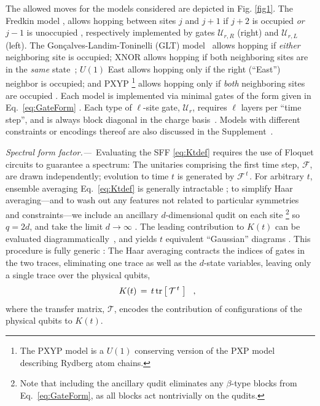 \documentclass[prl,aps,amsfonts,twocolumn,superscriptaddress,notitlepage,floatfix]{revtex4-1}
\newcommand{\be}{\begin{eqnarray}}
\newcommand{\ee}{\end{eqnarray}}
\newcommand{\tr}[1]{{\rm tr} \left[ #1 \right]}
\def\gate{\mathcal{U}}
\def\Floq{\mathcal{F}}
\def\Tmat{\mathcal{T}}
\def\Ldim{q}
\def\ancilla{d}
\begin{document}
The allowed moves for the models considered are depicted in Fig. \ref{fig1}. The Fredkin model \cite{FredkinEntanglement,Korepin2016fredkin,Korepin2017fredkin,ChenFredkin2017,ChenFredkin2017a,Zhang2017fredkin,Udagawa2017fredkin,FredkinFragmentScar,ChenFredkin2020}, allows hopping between sites $j$ and $j+1$ if $j+2$ is occupied %
\emph{or} $j-1$ is unoccupied%
, respectively implemented by gates $\gate^{\,}_{r,R}$ (right) and $\gate^{\,}_{r,L}$ (left). %
The Gon\c{c}alves-Landim-Toninelli (GLT) model~\cite{GLT} allows hopping if \emph{either} neighboring site is occupied; XNOR allows hopping if both neighboring sites are in the \emph{same} state~\cite{PhysRevLett.124.207602,10.21468/SciPostPhysCore.4.2.010,PhysRevLett.125.245303,2021arXiv210502252P,2021arXiv210600696P,2021arXiv210804845B}; $U(1)$ East allows hopping only if the right (``East'') neighbor is occupied; and PXYP \footnote{The PXYP model is a $U(1)$ conserving version of the PXP model describing Rydberg atom chains.} allows hopping only if \emph{both} neighboring sites are occupied \cite{KCMRydberg,Bernien2017,Turner2018,PhysRevLett.121.085701,MotrunichRydbergScar,Bluvstein_2021}. Each model is implemented via minimal gates of the form given in Eq.~\ref{eq:GateForm}%
. Each type of $\ell$-site gate,  $\gate^{\,}_r$, requires $\ell$ layers per ``time step'', and is always block diagonal in the charge basis~\cite{supp}. Models with different constraints %
or encodings thereof are also discussed in the Supplement~\cite{supp}.



\noindent \emph{Spectral form factor.---}\, Evaluating the SFF \eqref{eq:Ktdef} requires the use of Floquet circuits to guarantee a spectrum: The unitaries comprising the first time step, $\Floq$, are drawn independently; evolution to time $t$ is generated by $\Floq^{\, t\,}$. For arbitrary $t$, ensemble averaging Eq.~\ref{eq:Ktdef} is generally intractable \cite{YoshidaCBD,CDLC1,U1FRUC,SanjayAmosFracton}; to simplify Haar averaging---and to wash out any features not related to particular symmetries and constraints---we include an ancillary $\ancilla$-dimensional qudit on each site \footnote{Note that including the ancillary qudit eliminates any $\beta$-type blocks from Eq.~\ref{eq:GateForm}, as all blocks act nontrivially on the qudits.} so $\Ldim=2 \ancilla$, and take the limit $\ancilla \to \infty$ \cite{U1FRUC,SanjayAmosFracton}. The leading contribution to $K(t)$ can be evaluated diagrammatically~\cite{BnB}, and yields $t$ equivalent ``Gaussian'' diagrams \cite{BnB,CDLC1,U1FRUC}. This procedure is fully generic \cite{U1FRUC,SanjayAmosFracton,supp}: The Haar averaging contracts the indices of gates in the two traces, eliminating one trace as well as the $\ancilla$-state variables, leaving only a single trace over the physical qubits,
\be \label{eq:KtAvgd} K(t) \, = \, t \, \tr{ \, \Tmat^{\, t \,}\,}~~,~~\ee
where the transfer matrix, $\Tmat$, encodes the contribution of configurations of the physical qubits to $K(t)$. 
\end{document}
